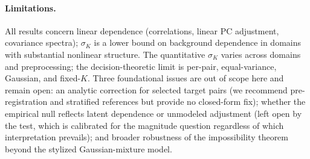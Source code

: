 \paragraph{Limitations.} All results concern linear dependence (correlations, linear PC adjustment, covariance spectra); $\sigma_K$ is a lower bound on background dependence in domains with substantial nonlinear structure. The quantitative $\sigma_K$ varies across domains and preprocessing; the decision-theoretic limit is per-pair, equal-variance, Gaussian, and fixed-$K$. Three foundational issues are out of scope here and remain open: an analytic correction for selected target pairs (we recommend pre-registration and stratified references but provide no closed-form fix); whether the empirical null reflects latent dependence or unmodeled adjustment (left open by the test, which is calibrated for the magnitude question regardless of which interpretation prevails); and broader robustness of the impossibility theorem beyond the stylized Gaussian-mixture model.
